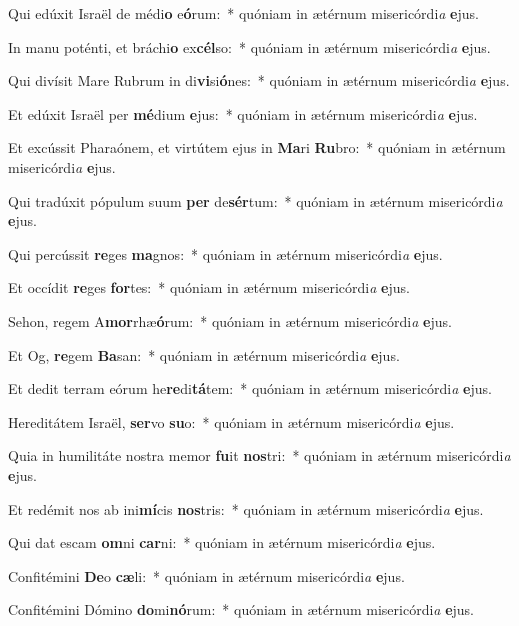 \item Qui edúxit Israël de médi\textbf{o} e\textbf{ó}rum:~* quóniam in ætérnum misericórdi\textit{a} \textbf{e}jus.
\item In manu poténti, et bráchi\textbf{o} ex\textbf{cél}so:~* quóniam in ætérnum misericórdi\textit{a} \textbf{e}jus.
\item Qui divísit Mare Rubrum in di\textbf{vi}si\textbf{ó}nes:~* quóniam in ætérnum misericórdi\textit{a} \textbf{e}jus.
\item Et edúxit Israël per \textbf{mé}dium \textbf{e}jus:~* quóniam in ætérnum misericórdi\textit{a} \textbf{e}jus.
\item Et excússit Pharaónem, et virtútem ejus in \textbf{Ma}ri \textbf{Ru}bro:~* quóniam in ætérnum misericórdi\textit{a} \textbf{e}jus.
\item Qui tradúxit pópulum suum \textbf{per} de\textbf{sér}tum:~* quóniam in ætérnum misericórdi\textit{a} \textbf{e}jus.
\item Qui percússit \textbf{re}ges \textbf{ma}gnos:~* quóniam in ætérnum misericórdi\textit{a} \textbf{e}jus.
\item Et occídit \textbf{re}ges \textbf{for}tes:~* quóniam in ætérnum misericórdi\textit{a} \textbf{e}jus.
\item Sehon, regem A\textbf{mor}rhæ\textbf{ó}rum:~* quóniam in ætérnum misericórdi\textit{a} \textbf{e}jus.
\item Et Og, \textbf{re}gem \textbf{Ba}san:~* quóniam in ætérnum misericórdi\textit{a} \textbf{e}jus.
\item Et dedit terram eórum he\textbf{re}di\textbf{tá}tem:~* quóniam in ætérnum misericórdi\textit{a} \textbf{e}jus.
\item Hereditátem Israël, \textbf{ser}vo \textbf{su}o:~* quóniam in ætérnum misericórdi\textit{a} \textbf{e}jus.
\item Quia in humilitáte nostra memor \textbf{fu}it \textbf{nos}tri:~* quóniam in ætérnum misericórdi\textit{a} \textbf{e}jus.
\item Et redémit nos ab ini\textbf{mí}cis \textbf{nos}tris:~* quóniam in ætérnum misericórdi\textit{a} \textbf{e}jus.
\item Qui dat escam \textbf{om}ni \textbf{car}ni:~* quóniam in ætérnum misericórdi\textit{a} \textbf{e}jus.
\item Confitémini \textbf{De}o \textbf{cæ}li:~* quóniam in ætérnum misericórdi\textit{a} \textbf{e}jus.
\item Confitémini Dómino \textbf{do}mi\textbf{nó}rum:~* quóniam in ætérnum misericórdi\textit{a} \textbf{e}jus.
